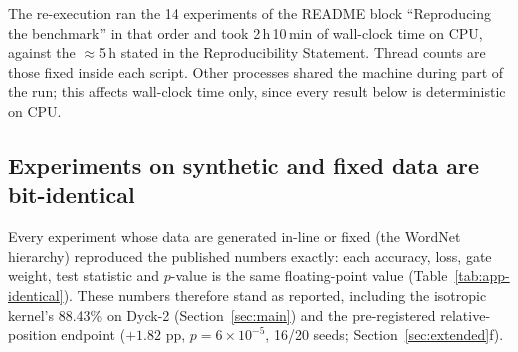 \documentclass[11pt]{article}
\begin{document}
\begin{table}[h]
\centering\small
{}
\caption{Environments. $^\dagger$\texttt{fast\_gaussian\_test.py}, \texttt{exp\_codigo\_extrapolativo.py}, \texttt{exp\_rope.py}. The Colab session had a GPU attached; these scripts do not use it.}
\label{tab:app-env}
\end{table}

The re-execution ran the 14 experiments of the README block ``Reproducing the benchmark'' in that order and took 2\,h\,10\,min of wall-clock time on CPU, against the $\approx$5\,h stated in the Reproducibility Statement. Thread counts are those fixed inside each script. Other processes shared the machine during part of the run; this affects wall-clock time only, since every result below is deterministic on CPU.

\subsection{Experiments on synthetic and fixed data are bit-identical}\label{app:identical}

Every experiment whose data are generated in-line or fixed (the WordNet hierarchy) reproduced the published numbers exactly: each accuracy, loss, gate weight, test statistic and $p$-value is the same floating-point value (Table~\ref{tab:app-identical}). These numbers therefore stand as reported, including the isotropic kernel's 88.43\% on Dyck-2 (Section~\ref{sec:main}) and the pre-registered relative-position endpoint ($+1.82$ pp, $p = 6\times10^{-5}$, 16/20 seeds; Section~\ref{sec:extended}f).
\end{document}
